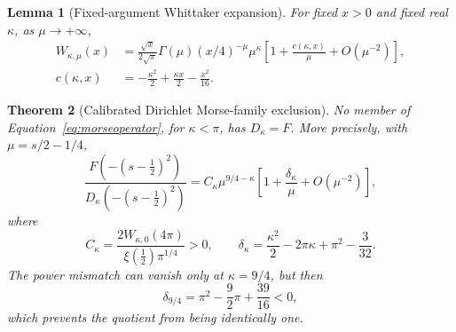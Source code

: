 \documentclass[11pt,letterpaper]{article}
\numberwithin{equation}{section}
\newtheorem{theorem}{Theorem}[section]
\newtheorem{lemma}[theorem]{Lemma}
\theoremstyle{definition}
\theoremstyle{remark}
\begin{document}
\begin{lemma}[Fixed-argument Whittaker expansion]
\label{lem:whittaker}
For fixed $x>0$ and fixed real $\kappa$, as $\mu\to+\infty$,
\begin{align}
 W_{\kappa,\mu}(x)
 &=\frac{\sqrt x}{2\sqrt\pi}\Gamma(\mu)
       (x/4)^{-\mu}\mu^\kappa
       \left[1+\frac{c(\kappa,x)}{\mu}+O(\mu^{-2})\right],\label{eq:whittakerexpansion}\\
 c(\kappa,x)&=-\frac{\kappa^2}{2}+\frac{\kappa x}{2}-\frac{x^2}{16}.
 \label{eq:whittakercoefficient}
\end{align}
\end{lemma}

\begin{theorem}[Calibrated Dirichlet Morse-family exclusion]
\label{thm:morseexclusion}
No member of Equation~\eqref{eq:morseoperator}, for $\kappa<\pi$, has $D_\kappa=F$. More precisely, with $\mu=s/2-1/4$,
\begin{equation}
 \frac{F(-(s-\tfrac12)^2)}{D_\kappa(-(s-\tfrac12)^2)}
 =C_\kappa\mu^{9/4-\kappa}
 \left[1+\frac{\delta_\kappa}{\mu}+O(\mu^{-2})\right],
 \label{eq:morseratio}
\end{equation}
where
\begin{equation}
 C_\kappa=\frac{2W_{\kappa,0}(4\pi)}{\xi(\tfrac12)\pi^{1/4}}>0,
 \qquad
 \delta_\kappa=\frac{\kappa^2}{2}-2\pi\kappa+\pi^2-\frac3{32}.
 \label{eq:morseconstants}
\end{equation}
The power mismatch can vanish only at $\kappa=9/4$, but then
\begin{equation}
 \delta_{9/4}=\pi^2-\frac92\pi+\frac{39}{16}<0,
 \label{eq:nonzeroresidue}
\end{equation}
which prevents the quotient from being identically one.
\end{theorem}
\end{document}
